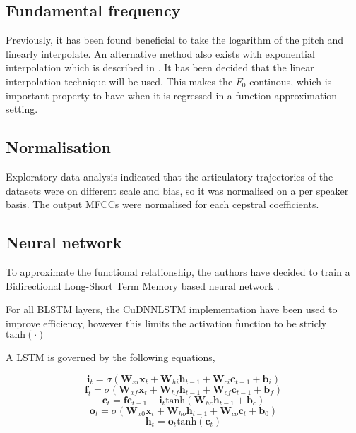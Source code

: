 \documentclass[a4paper]{article}
\begin{document}
\subsection{Fundamental frequency}

Previously, it has been found beneficial to take the logarithm of the
pitch and linearly interpolate. \cite{Gonzalez2017} An alternative method also exists with
exponential interpolation which is described in \cite{Chen1997}.
It has been decided that the linear interpolation technique will be used.
This makes the \( F_0 \) continous, which is important property to have
when it is regressed in a function approximation setting.

\subsection{Normalisation}

Exploratory data analysis indicated that the articulatory trajectories of
the datasets were on different scale and bias, so it was normalised
on a per speaker basis. The output MFCCs were normalised for each cepstral
coefficients.

\subsection{Neural network}

To approximate the functional relationship, the authors have decided to
train a Bidirectional Long-Short Term Memory based neural network \cite{Hochreiter1997}. 

For all BLSTM layers, the CuDNNLSTM implementation have been used to
improve efficiency, however this limits the activation function to be
stricly \( \text{tanh}(\cdot) \)

A LSTM is governed by the following equations,

\begin{equation}
  \mathbf{i}_{t} = \sigma ( \mathbf{W}_{xi} \mathbf{x}_{t} + \mathbf{W}_{hi}
  \mathbf{h}_{t-1} + \mathbf{W}_{ci} \mathbf{c}_{t-1} + \mathbf{b}_{i})  
\end{equation}
\begin{equation}
  \mathbf{f}_{t} = \sigma ( \mathbf{W}_{xf} \mathbf{x}_{t} + \mathbf{W}_{hf}
  \mathbf{h}_{t-1} + \mathbf{W}_{cf} \mathbf{c}_{t-1} + \mathbf{b}_{f})  
\end{equation}
\begin{equation}
  \mathbf{c}_{t} = \mathbf{f} \mathbf{c}_{t-1} + \mathbf{i}_{t} \text{tanh} ( \mathbf{W}_{hc}
  \mathbf{h}_{t-1} + \mathbf{b}_c)
\end{equation}
\begin{equation}
  \mathbf{o}_{t} = \sigma ( \mathbf{W}_{x0}\mathbf{x}_t + \mathbf{W}_{ho} \mathbf{h}_{t-1}
  + \mathbf{W}_{co}\mathbf{c}_{t} + \mathbf{b}_0 )
\end{equation}
\begin{equation}
  \mathbf{h}_t = \mathbf{o}_{t} \text{tanh} ( \mathbf{c}_t )
  \end{equation}
\end{document}
